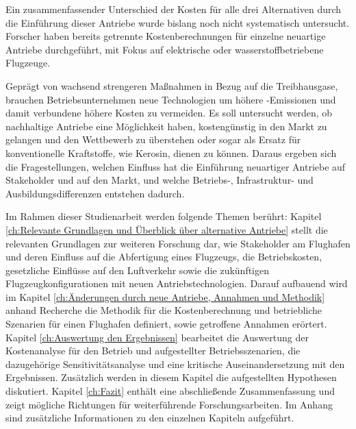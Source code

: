 Ein zusammenfassender Unterschied der Kosten für alle drei Alternativen durch die Einführung dieser Antriebe 
wurde bislang noch nicht systematisch untersucht. 
Forscher haben bereits getrennte Kostenberechnungen für einzelne neuartige Antriebe durchgeführt, mit Fokus auf
elektrische oder wasserstoffbetriebene Flugzeuge. 

Geprägt von wachsend strengeren Maßnahmen in Bezug auf die Treibhausgase, brauchen Betriebsunternehmen neue Technologien um
höhere -Emissionen und damit verbundene höhere Kosten zu vermeiden.
Es soll untersucht werden, ob nachhaltige Antriebe eine Möglichkeit haben, 
kostengünstig in den Markt zu gelangen und den Wettbewerb zu überstehen oder 
sogar als Ersatz für konventionelle Kraftstoffe, wie Kerosin, dienen zu können. 
Daraus ergeben sich die Fragestellungen, welchen Einfluss hat die Einführung neuartiger Antriebe 
auf Stakeholder und auf den Markt, und welche Betriebs-, Infrastruktur- und Ausbildungsdifferenzen entstehen dadurch.

Im Rahmen dieser Studienarbeit werden folgende Themen berührt:
Kapitel \ref{ch:Relevante Grundlagen und Überblick über alternative Antriebe} stellt 
die relevanten Grundlagen zur weiteren Forschung dar, wie Stakeholder am Flughafen und 
deren Einfluss auf die Abfertigung eines Flugzeugs, die Betriebskosten, 
gesetzliche Einflüsse auf den Luftverkehr sowie die zukünftigen Flugzeugkonfigurationen 
mit neuen Antriebstechnologien.
Darauf aufbauend wird im Kapitel \ref{ch:Änderungen durch neue Antriebe, Annahmen und Methodik} 
anhand Recherche die Methodik für die Kostenberechnung und betriebliche Szenarien für einen Flughafen definiert, 
sowie getroffene Annahmen erörtert.
Kapitel \ref{ch:Auswertung den Ergebnissen} bearbeitet die Auswertung der Kostenanalyse 
für den Betrieb und aufgestellter Betriebsszenarien, die dazugehörige Sensitivitätsanalyse und
eine kritische Auseinandersetzung mit den Ergebnissen. 
Zusätzlich werden in diesem Kapitel die aufgestellten Hypothesen diskutiert.
Kapitel \ref{ch:Fazit} enthält eine abschließende Zusammenfassung 
und zeigt mögliche Richtungen für weiterführende Forschungsarbeiten.
Im Anhang sind zusätzliche Informationen zu den einzelnen Kapiteln aufgeführt.
